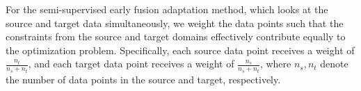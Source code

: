 


  For the semi-supervised early fusion adaptation method, which looks at the source and target data
  simultaneously, we weight 
  the data points such that the constraints from the source and target domains
 effectively contribute equally to the optimization problem.  Specifically,
  each source data point receives a weight of $\frac{n_t}{n_s+n_t}$, and each target
  data point receives a weight of $\frac{n_s}{n_s+n_t}$, where $n_s,n_t$ denote the
  number of data points in the source and target, respectively.
  
